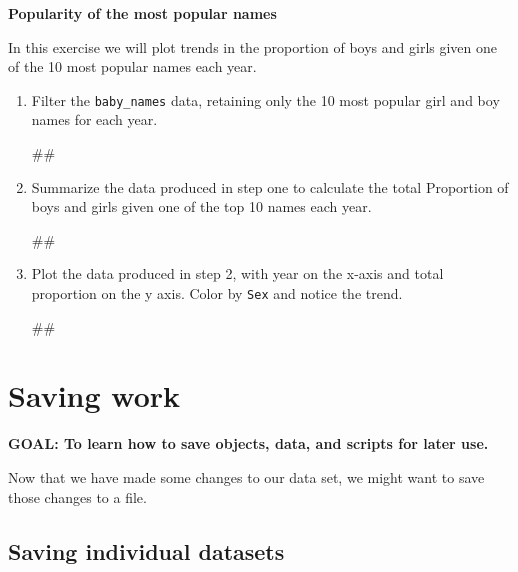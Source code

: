 \documentclass[]{book}
\newenvironment{Shaded}{\begin{snugshade}}{\end{snugshade}}
\newcommand{\NormalTok}[1]{#1}
\begin{document}
\textbf{Popularity of the most popular names}

In this exercise we will plot trends in the proportion of boys and girls
given one of the 10 most popular names each year.

\begin{enumerate}
\def\labelenumi{\arabic{enumi}.}
\item
  Filter the \texttt{baby\_names} data, retaining only the 10 most
  popular girl and boy names for each year.

\begin{Shaded}
\begin{Highlighting}[]
\NormalTok{##}
\end{Highlighting}
\end{Shaded}
\item
  Summarize the data produced in step one to calculate the total
  Proportion of boys and girls given one of the top 10 names each year.

\begin{Shaded}
\begin{Highlighting}[]
\NormalTok{##}
\end{Highlighting}
\end{Shaded}
\item
  Plot the data produced in step 2, with year on the x-axis and total
  proportion on the y axis. Color by \texttt{Sex} and notice the trend.

\begin{Shaded}
\begin{Highlighting}[]
\NormalTok{##}
\end{Highlighting}
\end{Shaded}
\end{enumerate}

\section{Saving work}\label{saving-work}

\textbf{GOAL: To learn how to save objects, data, and scripts for later
use.}

Now that we have made some changes to our data set, we might want to
save those changes to a file.

\subsection{Saving individual
datasets}\label{saving-individual-datasets}
\end{document}

